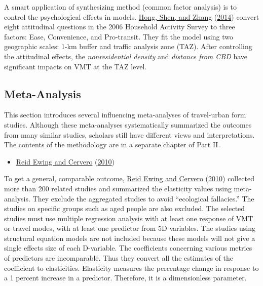 \documentclass[
  12pt,
]{article}
\providecommand{\tightlist}{%
  \setlength{\itemsep}{0pt}\setlength{\parskip}{0pt}}
\begin{document}
A smart application of synthesizing method (common factor analysis) is to control the psychological effects in models. \protect\hyperlink{ref-hongHowBuiltenvironmentFactors2014}{Hong, Shen, and Zhang} (\protect\hyperlink{ref-hongHowBuiltenvironmentFactors2014}{2014}) convert eight attitudinal questions in the 2006 Household Activity Survey to three factors: Ease, Convenience, and Pro-transit. They fit the model using two geographic scales: 1-km buffer and traffic analysis zone (TAZ). After controlling the attitudinal effects, the \emph{nonresidential density} and \emph{distance from CBD} have significant impacts on VMT at the TAZ level.

\hypertarget{meta-analysis}{%
\subsection{Meta-Analysis}\label{meta-analysis}}

This section introduces several influencing meta-analyses of travel-urban form studies. Although these meta-analyses systematically summarized the outcomes from many similar studies, scholars still have different views and interpretations. The contents of the methodology are in a separate chapter of Part II.

\begin{itemize}
\tightlist
\item
  \protect\hyperlink{ref-ewingTravelBuiltEnvironment2010}{Reid Ewing and Cervero} (\protect\hyperlink{ref-ewingTravelBuiltEnvironment2010}{2010})
\end{itemize}

To get a general, comparable outcome, \protect\hyperlink{ref-ewingTravelBuiltEnvironment2010}{Reid Ewing and Cervero} (\protect\hyperlink{ref-ewingTravelBuiltEnvironment2010}{2010}) collected more than 200 related studies and summarized the elasticity values using meta-analysis. They exclude the aggregated studies to avoid ``ecological fallacies.'' The studies on specific groups such as aged people are also excluded. The selected studies must use multiple regression analysis with at least one response of VMT or travel modes, with at least one predictor from 5D variables. The studies using structural equation models are not included because these models will not give a single effects size of each D-variable. The coefficients concerning various metrics of predictors are incomparable. Thus they convert all the estimates of the coefficient to elasticities. Elasticity measures the percentage change in response to a 1 percent increase in a predictor. Therefore, it is a dimensionless parameter.
\end{document}
